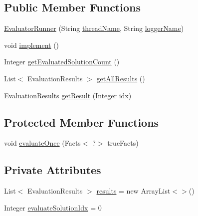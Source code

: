 \subsection*{Public Member Functions}
\begin{DoxyCompactItemize}
\item 
\hyperlink{classit_1_1emarolab_1_1cagg_1_1core_1_1evaluation_1_1ThreadedEvaluator_1_1EvaluatorRunner_ac00f4fc61c7a54c2b9e14684d3e6f7db}{Evaluator\-Runner} (String \hyperlink{classit_1_1emarolab_1_1cagg_1_1core_1_1evaluation_1_1CaggThread_a9f93a5dd960d289f5e2a1889f8b6f55b}{thread\-Name}, String \hyperlink{classit_1_1emarolab_1_1cagg_1_1core_1_1evaluation_1_1CaggThread_ae7dd4d1aec246c90d4a997b825978256}{logger\-Name})
\item 
void \hyperlink{classit_1_1emarolab_1_1cagg_1_1core_1_1evaluation_1_1ThreadedEvaluator_1_1EvaluatorRunner_a7b525fad9b253d9aae30fe94cad2e788}{implement} ()
\item 
Integer \hyperlink{classit_1_1emarolab_1_1cagg_1_1core_1_1evaluation_1_1ThreadedEvaluator_1_1EvaluatorRunner_a65aca67d0ab51ffd3787c7e4663bd622}{get\-Evaluated\-Solution\-Count} ()
\item 
List$<$ Evaluation\-Results $>$ \hyperlink{classit_1_1emarolab_1_1cagg_1_1core_1_1evaluation_1_1ThreadedEvaluator_1_1EvaluatorRunner_acbf8c07ca6fbe9296f94f88499b69d2a}{get\-All\-Results} ()
\item 
Evaluation\-Results \hyperlink{classit_1_1emarolab_1_1cagg_1_1core_1_1evaluation_1_1ThreadedEvaluator_1_1EvaluatorRunner_af77f2773e2c1133de645d5b9e2b6aa34}{get\-Result} (Integer idx)
\end{DoxyCompactItemize}
\subsection*{Protected Member Functions}
\begin{DoxyCompactItemize}
\item 
void \hyperlink{classit_1_1emarolab_1_1cagg_1_1core_1_1evaluation_1_1ThreadedEvaluator_1_1EvaluatorRunner_a5ab1d558bd791fd21cbedaf3504e83e8}{evaluate\-Once} (Facts$<$ ?$>$ true\-Facts)
\end{DoxyCompactItemize}
\subsection*{Private Attributes}
\begin{DoxyCompactItemize}
\item 
List$<$ Evaluation\-Results $>$ \hyperlink{classit_1_1emarolab_1_1cagg_1_1core_1_1evaluation_1_1ThreadedEvaluator_1_1EvaluatorRunner_af51b192937c6518b825ed3bed7960d82}{results} = new Array\-List$<$$>$()
\item 
Integer \hyperlink{classit_1_1emarolab_1_1cagg_1_1core_1_1evaluation_1_1ThreadedEvaluator_1_1EvaluatorRunner_af164a42dd65c05e231c6ae6abf701787}{evaluate\-Solution\-Idx} = 0
\end{DoxyCompactItemize}
